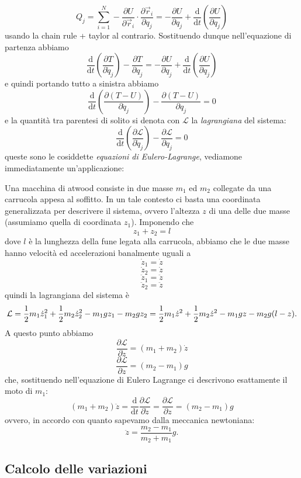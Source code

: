 \documentclass[11pt]{scrartcl}
\newcommand{\dif}{\text{d}}
\newcommand{\posit}{\vec{r}}
\newcommand{\LL}{\mathcal{L}}
\begin{document}
	$$Q_j=\sum_{i=1}^{N}-\frac{\partial U}{\partial \posit_i}\cdot \frac{\partial \posit_i}{\partial q_j}=-\frac{\partial U}{\partial q_j}+\frac{\dif}{\dif t}\left(\frac{\partial U}{\partial q_j}\right)$$
	usando la chain rule + taylor al contrario.	Sostituendo dunque nell'equazione di partenza abbiamo
	$$\frac{\dif}{\dif t}\left(\frac{\partial T}{\partial \dot{q}_j}\right)-\frac{\partial T}{\partial q_j}=-\frac{\partial U}{\partial q_j}+\frac{\dif}{\dif t}\left(\frac{\partial U}{\partial q_j}\right)$$
	e quindi portando tutto a sinistra abbiamo
	$$\frac{\dif}{\dif t}\left(\frac{\partial (T-U)}{\partial \dot{q}_j}\right)-\frac{\partial (T-U)}{\partial q_j}=0$$
	e la quantità tra parentesi di solito si denota con $\LL$ la \textit{lagrangiana} del sistema:
	$$\frac{\dif}{\dif t}\left(\frac{\partial \mathcal{L}}{\partial \dot{q}_j}\right)-\frac{\partial \mathcal{L}}{\partial q_j}=0$$
	queste sono le cosiddette \textit{equazioni di Eulero-Lagrange}, vediamone immediatamente un'applicazione:
	\begin{example}
		Una macchina di atwood consiste in due masse $m_1$ ed $m_2$ collegate da una carrucola appesa al soffitto. In un tale contesto ci basta una coordinata generalizzata per descrivere il sistema, ovvero l'altezza $z$ di una delle due masse (assumiamo quella di coordinata $z_1$).
		Imponendo che 
		$$z_1+z_2=l$$
		dove $l$ è la lunghezza della fune legata alla carrucola, abbiamo che le due masse hanno velocità ed accelerazioni banalmente uguali a
		$$\dot{z}_1=\dot{z}$$
		$$\dot{z}_2=\dot{z}$$
		$$\ddot{z}_1=\ddot{z}$$
		$$\ddot{z}_2=\ddot{z}$$
		quindi la lagrangiana del sistema è
		$$\mathcal{L}=\frac{1}{2} m_1\dot{z}_1^2+\frac{1}{2} m_2 \dot{z}_2^2-m_1gz_1-m_2gz_2=\frac{1}{2} m_1\dot{z}^2+\frac{1}{2} m_2 \dot{z}^2-m_1gz-m_2g(l-z).$$
		A questo punto abbiamo
		$$\frac{\partial \mathcal{L}}{\partial \dot{z}}=(m_1+m_2)\dot{z}$$
		$$\frac{\partial \mathcal{L}}{\partial z}=(m_2-m_1)g$$
		che, sostituendo nell'equazione di Eulero Lagrange ci descrivono esattamente il moto di $m_1$:
		$$(m_1+m_2)\ddot{z}=\frac{\dif}{\dif t}\frac{\partial \mathcal{L}}{\partial \dot{z}}=\frac{\partial \mathcal{L}}{\partial z}=(m_2-m_1)g$$
		ovvero, in accordo con quanto sapevamo dalla meccanica newtoniana:
		$$\ddot{z}=\frac{m_2-m_1}{m_2+m_1}g.$$
	\end{example}
	
	\subsection{Calcolo delle variazioni}
	
\end{document}
